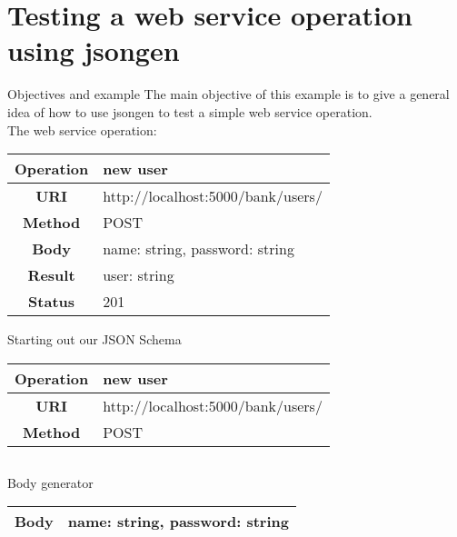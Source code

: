 \section{Testing a web service operation using jsongen}


\begin{frame}{Objectives and example}
  The main objective of this example is to give a general idea of how
  to use jsongen to test a simple web service operation.\\

  The web service operation:\\

  \centering
  \begin{tabular}{| c | l |}
    \hline
    \textbf{Operation} & new user \\ \hline
    \textbf{URI}       & http://localhost:5000/bank/users/ \\ \hline
    \textbf{Method}    & POST     \\ \hline
    \textbf{Body}      & name: string, password: string \\ \hline
    \textbf{Result}    & user: string \\ \hline
    \textbf{Status}    & 201 \\ \hline
  \end{tabular}
  \centering
\end{frame}

\begin{frame}{Starting out our JSON Schema}
  \centering
  \begin{tabular}{| c | l |}
    \hline
    \textbf{Operation} & new user \\ \hline
    \textbf{URI}       & http://localhost:5000/bank/users/ \\ \hline
    \textbf{Method}    & POST     \\ \hline
  \end{tabular}
  \centering
  \inputminted{js}{./code/example1_op_description.jsch}
\end{frame}

\begin{frame}{Body generator}
  \centering
  \begin{tabular}{| c | l |}
    \hline
    \textbf{Body} & name: string, password: string \\ \hline
  \end{tabular}
  \centering
  \inputminted{js}{./code/example1_body.jsch}
\end{frame}

